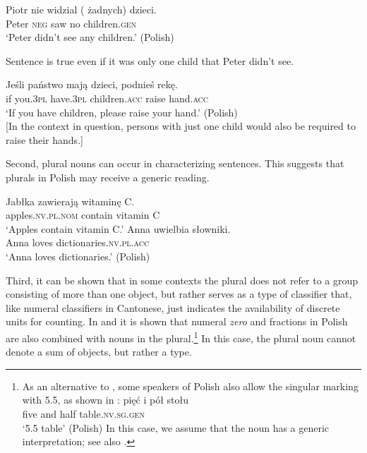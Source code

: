 \documentclass[output=paper,colorlinks,citecolor=brown,
]{langscibook}
\newcommand{\minsp}[1]{#1\hspace{-2pt}} %
\begin{document}
\ea\label{ex:16}
\gll Piotr nie widzial \minsp{(} żadnych) dzieci. \\ 
Peter \textsc{neg} saw {} no children.\textsc{gen} \\ 
\glt `Peter didn't see any children.' \hfill (Polish)\\
\z

\noindent Sentence  is true even if it was only one child that Peter didn't see.

\ea\label{ex:17}
\gll Jeśli państwo mają dzieci, podnieś rekę. \\ 
if you.\textsc{3pl} have.\textsc{3pl} children.\textsc{acc} raise hand.\textsc{acc} \\ 
\glt `If you have children, please raise your hand.' \hfill (Polish)\\
{[}In the context in question, persons with just one child would also be required to raise their hands.{]}
\z

\noindent Second, plural nouns can occur in characterizing sentences. This suggests that plurals in Polish may receive a generic reading.   

\ea\label{ex:18}
\ea
\gll Jabłka zawierają witaminę C. \\
apples.\textsc{nv.pl.nom} contain vitamin C \\ 
\glt `Apples contain vitamin C.'\label{ex:18a}
\ex 
\gll Anna uwielbia słowniki. \\
Anna loves dictionaries.\textsc{nv.pl.acc} \\
\glt `Anna loves dictionaries.'\label{ex:18b}
\hfill (Polish)\z\z

\noindent Third, it can be shown that in some contexts the plural does not refer to a group consisting of more than one object, but rather serves as a type of classifier that, like numeral classifiers in Cantonese, just indicates the availability of discrete units for counting. In  and  it is shown that numeral \textit{zero} and fractions in Polish are also combined with nouns in the plural.\footnote{As an alternative to , some speakers of Polish also allow the singular marking with 5.5, as shown in : 
\ea\gll pięć i pół stołu \\
five and half table.\textsc{nv.sg.gen} \\
\glt `5.5 table' \label{ex:fn4}
\hfill (Polish) \z
In this case, we assume that the noun has a generic interpretation; see also \citet{KwapiszewskiFuellenbach2021}.} In this case, the plural noun cannot denote a sum of objects, but rather a type.
\end{document}
